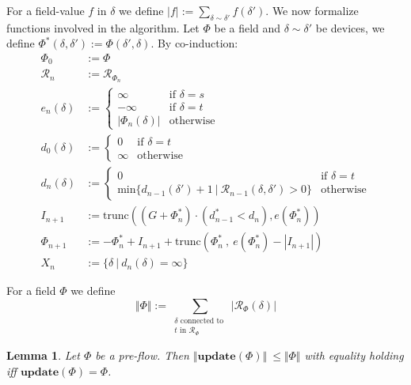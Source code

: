 \documentclass{article}
\theoremstyle{plain}
\newtheorem{lem}[teo]{Lemma}
\theoremstyle{definition}
\theoremstyle{remark}
\begin{document}
For a field-value $f$ in $\delta$ we define $\displaystyle{|f|:=\sum_{\delta\sim\delta'}f(\delta')}$.
We now formalize functions involved in the algorithm. Let $\Phi$ be a field and $\delta\sim\delta'$ be  devices, we define $\Phi^*(\delta, \delta'):=\Phi(\delta', \delta)$.
By co-induction:
\begin{equation*}
\begin{split}
\Phi_0 &:= \Phi\\
\mathcal{R}_n&:= \mathcal{R}_{\Phi_n}\\
e_n(\delta)&:=
\begin{cases}
\infty &\text{if\ }\delta=s\\
-\infty &\text{if\ }\delta=t\\
|\Phi_n(\delta)| &\text{otherwise}
\end{cases}\\
d_0(\delta)&:=
\begin{cases} 
0 &\text{if\ }\delta=t\\
\infty&\text{otherwise}
\end{cases}\\
d_n(\delta)&:=
\begin{cases}
0 &\text{if\ }\delta=t\\
 \mathrm{min}\big\{d_{n-1}(\delta') + 1\ |\  \mathcal{R}_{n-1}(\delta, \delta')>0\big\}&\text{otherwise}
\end{cases}\\
I_{n+1}&:= \mathrm{trunc}((G + \Phi^*_n)\cdot(d_{n-1}^*<d_n),  e(\Phi_n^*))\\
\Phi_{n+1}&:= -\Phi_n^* + I_{n+1} + \mathrm{trunc}(\Phi_n^*\ ,\  e(\Phi_n^*) - |I_{n+1}|)\\
X_n&:=\{\delta \ |\ d_n(\delta)=\infty\}
\end{split}
\end{equation*}

For a field $\Phi$ we define 
\begin{equation*}
\Vert \Phi \Vert:=\sum_{\substack{\delta \text{ connected to } \\ t    \text{ in } \mathcal{R}_{\Phi}}}|\mathcal{R}_{\Phi}(\delta)|
\end{equation*}

\begin{lem}
Let $\Phi$ be a pre-flow. Then  $\Vert \textbf{update}(\Phi) \Vert\ \leq \Vert \Phi \Vert$ with equality holding iff $\textbf{update}(\Phi)=\Phi$.
\end{lem}
\end{document}
